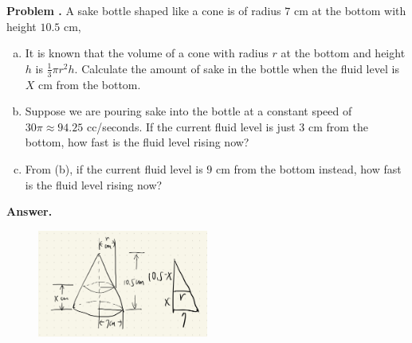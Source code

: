 \documentclass[11pt,letterpaper]{article}
\newcounter{problem}
\newcommand{\problem}{
	\stepcounter{problem}%
	\noindent \textbf{Problem \theproblem. }%
}
\newcommand{\answer}{\noindent \textbf{Answer. }}
\begin{document}
\problem A sake bottle shaped like a cone is of radius $7$ cm at the bottom with height $10.5$ cm,
\begin{enumerate}[(a)]
    \item It is known that the volume of a cone with radius $r$ at the bottom and height $h$ is $\frac{1}{3}\pi r^2 h$.  Calculate the amount of sake in the bottle when the fluid level is $X$ cm from the bottom.
    \item Suppose we are pouring sake into the bottle at a constant speed of $30 \pi \approx 94.25$ cc/seconds.  If the current fluid level is just $3$ cm from the bottom, how fast is the fluid level rising now?
    \item From (b), if the current fluid level is $9$ cm from the bottom instead, how fast is the fluid level rising now?
\end{enumerate}\vspace{6mm}

\pagebreak

\answer 

\begin{figure}[h]
    \centering
    \includegraphics[width = 0.5\textwidth]{../graph/A11_Sol_2.png}
\end{figure}
\end{document}
